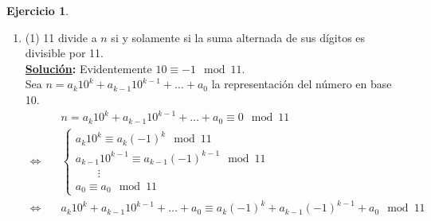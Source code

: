 \documentclass[11pt,letterpaper]{article}
\theoremstyle{definition}\newtheorem{p}{Ejercicio}
\newcommand{\sol}{\textbf{\underline{Solución}: }} %
\begin{document}
\begin{p}
\begin{enumerate}
    \item(1) 11 divide a $n$ si y solamente si la suma alternada de sus d\'igitos es divisible por 11.\\
    \sol Evidentemente $10 \equiv -1 \mod{11}$.\\
    Sea $n = a_k 10^k + a_{k-1} 10^{k-1} + \ldots + a_0$ la representación del número en base 10.
    \begin{align*}
        &\quad
        n = a_k 10^k + a_{k-1} 10^{k-1} + \ldots + a_0 \equiv 0 \mod{11}\\
        \iff&\quad
            \begin{cases}
            a_k 10^k \equiv a_k (-1)^k \mod{11}\\
            a_{k-1} 10^{k-1} \equiv a_{k-1} (-1)^{k-1} \mod{11}\\
            \qquad \vdots\\
            a_0 \equiv a_0 \mod{11}
            \end{cases}\\
        \iff&\quad
            a_k 10^k + a_{k-1} 10^{k-1} + \ldots + a_0 \equiv a_k (-1)^k + a_{k-1}(-1)^{k-1} + a_0 \mod{11}\\
    \end{align*}

\end{enumerate}
\end{p}
\end{document}
